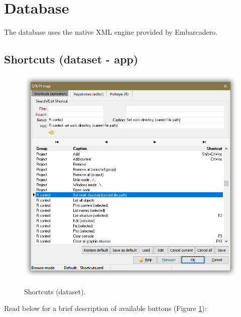 
\hypertarget{working_database}{}
\section{Database}

The database uses the native XML engine provided by Embarcadero.

\subsection{Shortcuts (dataset - app)}

\begin{figure}[H]
  \includegraphics[scale=0.35]{./res/dlg_skh_map_shortcuts.png}\\
  \caption{Shortcuts (dataset).}
  \label{fig:dlg_skh_map_shortcuts}
\end{figure}

Read below for a brief description of available buttons (Figure \ref{fig:dlg_skh_map_shortcuts}):

